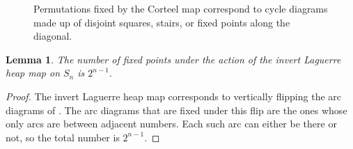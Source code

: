 \documentclass{amsart}
\newtheorem{lem}[thm]{Lemma}
\theoremstyle{definition}
\begin{document}
\begin{figure}[htbp]
  \centering
  \begin{minipage}{0.4\linewidth}
            \centering
        \end{minipage}
        \qquad
        \begin{minipage}{0.5\linewidth}
            \centering
        \end{minipage}
  \caption{Permutations fixed by the Corteel map correspond to cycle diagrams made up of disjoint squares, stairs, or fixed points along the diagonal.}
  \label{fig: SquaresStairs}
\end{figure}

\begin{lem}\label{lem: Laguerre fixed pts}  The number of fixed points under the action of the invert Laguerre heap map on $S_n$ is $2^{n-1}.$
\end{lem}

\begin{proof}
  The invert Laguerre heap map corresponds to vertically flipping the arc diagrams of \cite{reading2015noncrossing}. The arc diagrams that are fixed under this flip are the ones whose only arcs are between adjacent numbers. Each such arc can either be there or not, so the total number is $2^{n-1}$.
\end{proof}
\end{document}
